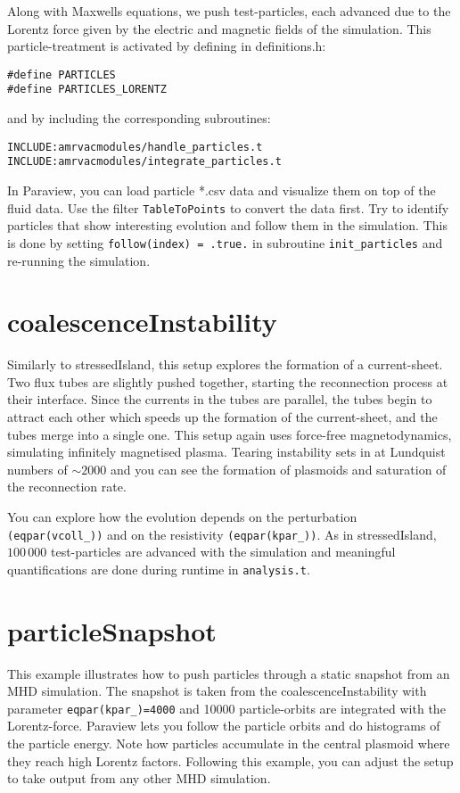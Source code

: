\documentclass[10pt]{article}
\begin{document}
Along with Maxwells equations, we push test-particles, each advanced due to the Lorentz force given by the electric and magnetic fields of the simulation.  
This particle-treatment is activated by defining in definitions.h:\\
\begin{verbatim}
#define PARTICLES
#define PARTICLES_LORENTZ
\end{verbatim}

and by including the corresponding subroutines:
\begin{verbatim}
INCLUDE:amrvacmodules/handle_particles.t
INCLUDE:amrvacmodules/integrate_particles.t
\end{verbatim}

In Paraview, you can load particle *.csv data and visualize them on top of the fluid data.  Use the filter {\tt TableToPoints} to convert the data first.  
Try to identify particles that show interesting evolution and follow them in the simulation.  This is done by setting {\tt follow(index) = .true.} in subroutine {\tt init\_particles} and re-running the simulation.  

\section*{coalescenceInstability}

Similarly to stressedIsland, this setup explores the formation of a current-sheet.  Two flux tubes are slightly pushed together, starting the reconnection process at their interface.  Since the currents in the tubes are parallel, the tubes begin to attract each other which speeds up the formation of the current-sheet, and the tubes merge into a single one.  This setup again uses force-free magnetodynamics, simulating infinitely magnetised plasma.  Tearing instability sets in at Lundquist numbers of $\sim2000$ and you can see the formation of plasmoids and saturation of the reconnection rate.  

You can explore how the evolution depends on the perturbation {\tt (eqpar(vcoll\_))} and on the resistivity {\tt (eqpar(kpar\_))}.  
As in stressedIsland, $100\,000$ test-particles are advanced with the simulation and meaningful quantifications are done during runtime in {\tt analysis.t}.  

\section*{particleSnapshot}

This example illustrates how to push particles through a static snapshot from an MHD simulation.  The snapshot is taken from the coalescenceInstability with parameter {\tt eqpar(kpar\_)=4000} and 10000 particle-orbits are integrated with the Lorentz-force.  
Paraview lets you follow the particle orbits and do histograms of the particle energy.  Note how particles accumulate in the central plasmoid where they reach high Lorentz factors.  
Following this example, you can adjust the setup to take output from any other MHD simulation.  
\end{document}
